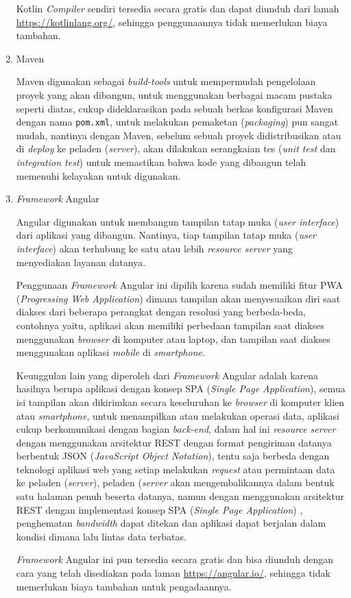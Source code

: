 \documentclass[pdftex,12pt, oneside]{article}
\begin{document}
\begin{enumerate}
Kotlin \textit{Compiler} sendiri tersedia secara gratis dan dapat diunduh dari lamah \href{https://kotlinlang.org/}{https://kotlinlang.org/}, sehingga penggunaannya tidak memerlukan biaya tambahan.

	\item Maven

Maven digunakan sebagai \textit{build-tools} untuk mempermudah pengelolaan proyek yang akan dibangun, untuk menggunakan berbagai macam pustaka seperti diatas, cukup dideklarasikan pada sebuah berkas konfigurasi Maven dengan nama \texttt{pom.xml}, untuk melakukan pemaketan (\textit{packaging}) pun sangat mudah, nantinya dengan Maven, sebelum sebuah proyek didistribusikan atau di \textit{deploy} ke peladen (\textit{server}), akan dilakukan serangkaian tes (\textit{unit test} dan \textit{integration test}) untuk memastikan bahwa kode yang dibangun telah memenuhi kelayakan untuk digunakan.

	\item \textit{Framework} Angular
	
	Angular digunakan untuk membangun tampilan tatap muka (\textit{user interface}) dari aplikasi yang dibangun. Nantinya, tiap tampilan tatap muka (\textit{user interface}) akan terhubung ke satu atau lebih \textit{resource server} yang menyediakan layanan datanya.
	
	Penggunaan \textit{Framework} Angular ini dipilih karena sudah memiliki fitur PWA (\textit{Progressing Web Application}) dimana tampilan akan menyesuaikan diri saat diakses dari beberapa perangkat dengan resolusi yang berbeda-beda, contohnya yaitu, aplikasi akan memiliki perbedaan tampilan saat diakses menggunakan \textit{browser} di komputer atau laptop, dan tampilan saat diakses menggunakan aplikasi \textit{mobile} di \textit{smartphone}.
	
	Keunggulan lain yang diperoleh dari \textit{Framework} Angular adalah karena hasilnya berupa aplikasi dengan konsep SPA (\textit{Single Page Application}), semua isi tampilan akan dikirimkan secara keseluruhan ke \textit{browser} di komputer klien atau \textit{smartphone}, untuk menampilkan atau melakukan operasi data, aplikasi cukup berkomunikasi dengan bagian \textit{back-end}, dalam hal ini \textit{resource server} dengan menggunakan arsitektur REST dengan format pengiriman datanya berbentuk JSON (\textit{JavaScript Object Notation}), tentu saja berbeda dengan teknologi aplikasi web yang setiap melakukan \textit{request} atau permintaan data ke peladen (\textit{server}), peladen (\textit{server} akan mengembalikannya dalam bentuk satu halaman penuh beserta datanya, namun dengan menggunakan arsitektur REST dengan implementasi konsep SPA (\textit{Single Page Application}) , penghematan \textit{bandwidth} dapat ditekan dan aplikasi dapat berjalan dalam kondisi dimana lalu lintas data terbatas.
	
	\textit{Framework} Angular ini pun tersedia secara gratis dan bisa diunduh dengan cara yang telah disediakan pada laman \href{https://angular.io/}{https://angular.io/}, sehingga tidak memerlukan biaya tambahan untuk pengadaannya.

\end{enumerate}
\end{document}
